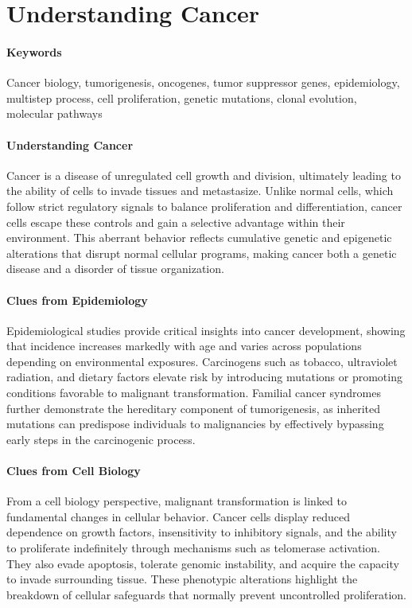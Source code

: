 \documentclass[10pt]{extarticle}
\begin{document}
\section{Understanding Cancer}  
\paragraph{Keywords} Cancer biology, tumorigenesis, oncogenes, tumor suppressor genes, epidemiology, multistep process, cell proliferation, genetic mutations, clonal evolution, molecular pathways \cite{NIH2007}

\paragraph{Understanding Cancer} Cancer is a disease of unregulated cell growth and division, ultimately leading to the ability of cells to invade tissues and metastasize. Unlike normal cells, which follow strict regulatory signals to balance proliferation and differentiation, cancer cells escape these controls and gain a selective advantage within their environment. This aberrant behavior reflects cumulative genetic and epigenetic alterations that disrupt normal cellular programs, making cancer both a genetic disease and a disorder of tissue organization.

\paragraph{Clues from Epidemiology}
Epidemiological studies provide critical insights into cancer development, showing that incidence increases markedly with age and varies across populations depending on environmental exposures. Carcinogens such as tobacco, ultraviolet radiation, and dietary factors elevate risk by introducing mutations or promoting conditions favorable to malignant transformation. Familial cancer syndromes further demonstrate the hereditary component of tumorigenesis, as inherited mutations can predispose individuals to malignancies by effectively bypassing early steps in the carcinogenic process.

\paragraph{Clues from Cell Biology}
From a cell biology perspective, malignant transformation is linked to fundamental changes in cellular behavior. Cancer cells display reduced dependence on growth factors, insensitivity to inhibitory signals, and the ability to proliferate indefinitely through mechanisms such as telomerase activation. They also evade apoptosis, tolerate genomic instability, and acquire the capacity to invade surrounding tissue. These phenotypic alterations highlight the breakdown of cellular safeguards that normally prevent uncontrolled proliferation.
\end{document}
